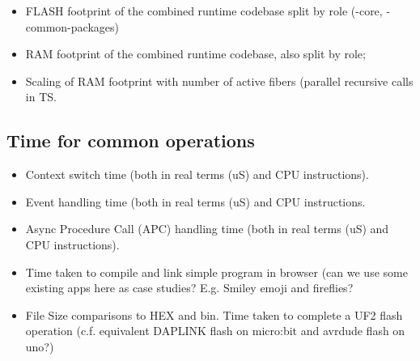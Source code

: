 \begin{itemize}

\item FLASH footprint of the combined runtime codebase split by role (\CON-core, \MCN-common-packages)
\item RAM footprint of the combined runtime codebase, also split by role; 
\item Scaling of RAM footprint with number of active fibers (parallel recursive calls in TS. 
\end{itemize}

\subsection{Time for common \CO operations}

\begin{itemize}
\item Context switch time (both in real terms (uS) and CPU instructions). 
\item Event handling time (both in real terms (uS) and CPU instructions. 
\item Async Procedure Call (APC) handling time (both in real terms (uS) and CPU instructions). 
\end{itemize}





\begin{itemize}
\item Time taken to compile and link simple program in browser (can we use some existing apps 
      here as case studies? E.g. Smiley emoji and fireflies?
\item \UF File Size comparisons to HEX and bin. Time taken to complete a UF2 flash operation 
    (c.f. equivalent DAPLINK flash on micro:bit and avrdude flash on uno?)
\end{itemize}

